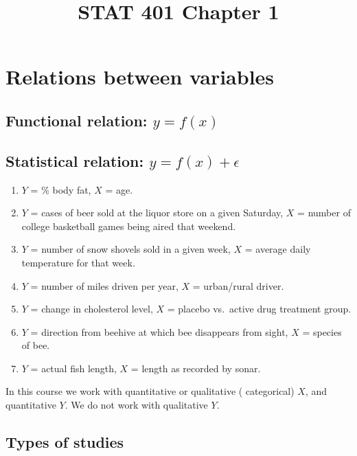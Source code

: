 \documentclass[12pt]{article}
\begin{document}
\title{STAT 401 Chapter 1}
\maketitle

\section{Relations between variables}

\subsection{Functional relation: $y = f(x)$}


\subsection{Statistical relation: $y = f(x) + \epsilon$}


\bigskip

\example
\begin{enumerate}
\item $Y$ = \% body fat, $X$ = age.
\item
    $Y$ = cases of beer sold at the liquor store on a given Saturday,
    $X$ = number of college basketball games being aired that weekend.
\item
    $Y$ = number of snow shovels sold in a given week,
    $X$ = average daily temperature for that week.
\item
    $Y$ = number of miles driven per year, $X$ = urban/rural driver.
\item
    $Y$ = change in cholesterol level,
    $X$ = placebo vs.\ active drug treatment group.
\item
    $Y$ = direction from beehive at which bee disappears from sight,
    $X$ = species of bee.
\item $Y$ = actual fish length, $X$ = length as recorded by sonar.
\end{enumerate}

In this course we work with quantitative or qualitative (\ie
categorical) $X$, and quantitative $Y$.
We do not work with qualitative $Y$.

\subsection{Types of studies}
\end{document}
